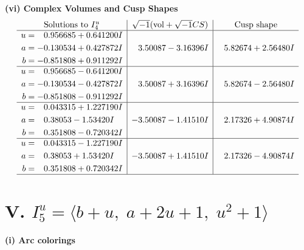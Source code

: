 \documentclass[1p]{elsarticle_modified}
\theoremstyle{definition}
\newcommand{\I}{\sqrt{-1}}
\begin{document}
\newpage\flushleft \textbf{(vi) Complex Volumes and Cusp Shapes}
$$\begin{array}{c|c|c}  
\text{Solutions to }I^u_{4}& \I (\text{vol} + \sqrt{-1}CS) & \text{Cusp shape}\\
 \hline 
\begin{aligned}
u &= \phantom{-}0.956685 + 0.641200 I \\
a &= -0.130534 + 0.427872 I \\
b &= -0.851808 + 0.911292 I\end{aligned}
 & \phantom{-}3.50087 - 3.16396 I & \phantom{-}5.82674 + 2.56480 I \\ \hline\begin{aligned}
u &= \phantom{-}0.956685 - 0.641200 I \\
a &= -0.130534 - 0.427872 I \\
b &= -0.851808 - 0.911292 I\end{aligned}
 & \phantom{-}3.50087 + 3.16396 I & \phantom{-}5.82674 - 2.56480 I \\ \hline\begin{aligned}
u &= \phantom{-}0.043315 + 1.227190 I \\
a &= \phantom{-}0.38053 - 1.53420 I \\
b &= \phantom{-}0.351808 - 0.720342 I\end{aligned}
 & -3.50087 - 1.41510 I & \phantom{-}2.17326 + 4.90874 I \\ \hline\begin{aligned}
u &= \phantom{-}0.043315 - 1.227190 I \\
a &= \phantom{-}0.38053 + 1.53420 I \\
b &= \phantom{-}0.351808 + 0.720342 I\end{aligned}
 & -3.50087 + 1.41510 I & \phantom{-}2.17326 - 4.90874 I\\
 \hline 
 \end{array}$$\newpage\newpage\renewcommand{\arraystretch}{1}
\centering \section*{V. $I^u_{5}= \langle b+u,\;a+2 u+1,\;u^2+1 \rangle$}
\flushleft \textbf{(i) Arc colorings}\\
\end{document}
